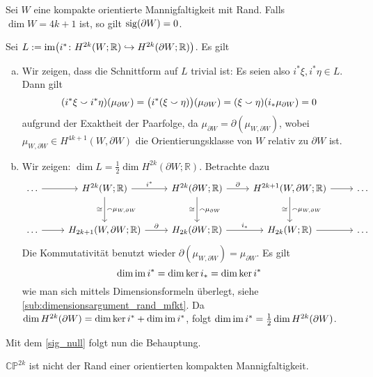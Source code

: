 \begin{satz}[{name=[{Rand einer 4k+1 Mannigfaltigkeit hat Signatur 0}]},label=satz:sig_rand_4k+1_mfkt]
	Sei $W$ eine kompakte orientierte Mannigfaltigkeit mit Rand.
	Falls $\dim W = 4k+1$ ist, so gilt $\sig(\partial W)=0$.
\end{satz}
\begin{beweis}
	Sei $L :=  \im \enbrace[\big]{i^* \colon H^{2k}(W;\mathbb{R}) \hookrightarrow H^{2k}(\partial W;\mathbb{R})}$. Es gilt
	\begin{enumerate}[a)]
		\item Wir zeigen, dass die Schnittform auf $L$ trivial ist:
		Es seien also $i^* \xi, i^* \eta \in L$.
		Dann gilt
		\[
			(i^* \xi \cupp i^* \eta) (\mu_{\partial W}) = \enbrace[\big]{i^*(\xi \cupp \eta)}(\mu_{\partial W})= (\xi \cupp \eta) \enbrace*{i_* \mu_{\partial W}} =0
		\]
		aufgrund der Exaktheit der Paarfolge, da $\mu_{\partial W}=\partial (\mu_{W,\partial W})$, wobei $\mu_{W,\partial W} \in H^{4k+1}(W,\partial W)$ die Orientierungsklasse von $W$ relativ zu $\partial W$ ist.
		\item Wir zeigen: $\dim L = \frac{1}{2} \dim H^{2k}(\partial W;\mathbb{R})$.
		Betrachte dazu
		\[
			\begin{tikzcd}[row sep=large, column sep=2.4em]
				\ldots  \rar & H^{2k}(W;\mathbb{R}) \dar["\capp \mu_{W,\partial W}","\cong"'] \rar["i^*"] & H^{2k}(\partial W;\mathbb{R})  \dar["\capp \mu_{\partial W}","\cong"']\rar["\partial"] & H^{2k+1}(W,\partial W;\mathbb{R}) \rar \dar["\capp \mu_{W,\partial W}","\cong"']& \ldots \\
				\ldots \rar & H_{2k+1}(W,\partial W;\mathbb{R}) \rar["\partial"] & H_{2k}(\partial W;\mathbb{R}) \rar["i_*"] & H_{2k}(W;\mathbb{R}) \rar & \ldots 
			\end{tikzcd}
		\]
		Die Kommutativität benutzt wieder $\partial (\mu_{W,\partial W})=\mu_{\partial W}$.
		Es gilt
		\[
			\dim \im i^* = \dim \ker i_* = \dim \ker i^*
		\]
		wie man sich mittels Dimensionsformeln überlegt, siehe \cref{sub:dimensionsargument_rand_mfkt}.
		Da $\dim H^{2k}(\partial W) = \dim \ker i^* + \dim \im i^*$, folgt $\dim \im i^* = \frac{1}{2} \dim H^{2k}(\partial W)$. 
	\end{enumerate}
	Mit dem \autoref{sig_null} folgt nun die Behauptung.
\end{beweis}

\begin{korollarB}[{name=[{Für gerade n ist der komplex projektive Raum nicht Rand einer Mannigfaltigkeit}]}]
	$\mathbb{CP}^{2k}$ ist nicht der Rand einer orientierten kompakten Mannigfaltigkeit.
\end{korollarB}

